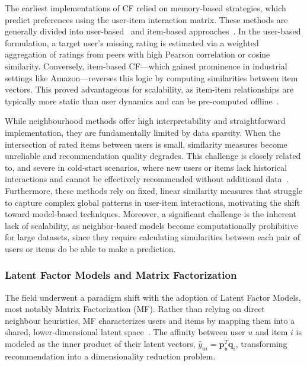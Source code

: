 \documentclass[11pt]{article}
\begin{document}
The earliest implementations of CF relied on memory-based strategies, which predict preferences using the user-item interaction matrix. These methods are generally divided into user-based~\cite{resnick1994grouplens,breese1998empirical} and item-based approaches~\cite{sarwar2001item,shardanand1995social}. In the user-based formulation, a target user's missing rating is estimated via a weighted aggregation of ratings from peers with high Pearson correlation or cosine similarity. Conversely, item-based CF—which gained prominence in industrial settings like Amazon—reverses this logic by computing similarities between item vectors. This proved advantageous for scalability, as item-item relationships are typically more static than user dynamics and can be pre-computed offline~\cite{sarwar2001item}.

While neighbourhood methods offer high interpretability and straightforward implementation, they are fundamentally limited by data sparsity. When the intersection of rated items between users is small, similarity measures become unreliable and recommendation quality degrades. This challenge is closely related to, and  severe in cold-start scenarios, where new users or items lack historical interactions and cannot be effectively recommended without additional data~\cite{schein2002methods}.
Furthermore, these methods rely on fixed, linear similarity measures that struggle to capture complex global patterns in user-item interactions, motivating the shift toward model-based techniques. Moreover, a significant challenge is the inherent lack of scalability, as neighbor-based models become computationally prohibitive for large datasets, since they require calculating simularities between each pair of users or items do be able to make a prediction.

\subsubsection{Latent Factor Models and Matrix Factorization}

The field underwent a paradigm shift with the adoption of Latent Factor Models, most notably Matrix Factorization (MF). Rather than relying on direct neighbour heuristics, MF characterizes users and items by mapping them into a shared, lower-dimensional latent space~\cite{koren2009matrix}. The affinity between user $u$ and item $i$ is modeled as the inner product of their latent vectors, $\hat{y}_{ui} = \mathbf{p}_u^T \mathbf{q}_i$,  transforming recommendation into a dimensionality reduction problem.
\end{document}
